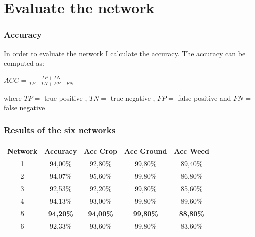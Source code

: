 \documentclass{beamer}
\begin{document}

\section{Evaluate the network}



\begin{frame}
\frametitle{Accuracy}

In order to evaluate the network I calculate the accuracy. The accuracy can be computed as:

\begin{center}

	$ ACC= \frac{TP+TN}{TP+TN+FP+FN} $

\end{center}

where $ TP = $ true positive , $ TN =$ true negative , $ FP =$ false positive  and $ FN =$ false negative 

\end{frame}


\begin{frame}
\frametitle{Results of the six networks}

\begin{table}
\centering

\begin{tabular}{|c|c|c|c|c|}
 \hline
 \textbf{Network} & \textbf{Accuracy} & \textbf{Acc Crop} & \textbf{Acc Ground} & \textbf{Acc Weed} \\ \hline
 1 & 94,00\% & 92,80\%  & 99,80\%  & 89,40\%  \\ \hline
 2 & 94,07\% & 95,60\%  & 99,80\%  & 86,80\%  \\ \hline
 3 & 92,53\% & 92,20\%  & 99,80\%  & 85,60\%  \\ \hline
 4 & 94,13\% & 93,00\%  & 99,80\%  & 89,60\%  \\ \hline
 \textbf{5} & \textbf{94,20\%} & \textbf{94,00\%}  & \textbf{99,80\%}  & \textbf{88,80\%}  \\ \hline
 6 & 92,33\% & 93,60\%  & 99,80\%  & 83,60\%  \\ \hline
\end{tabular}
\end{table}

\end{frame}
\end{document}
